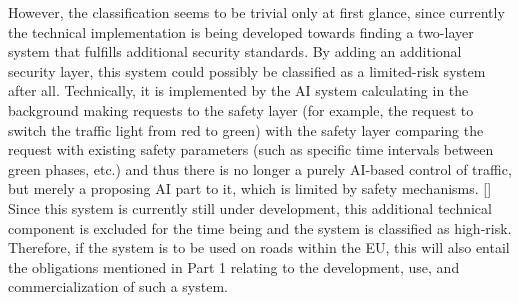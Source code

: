 However, the classification seems to be trivial only at first glance, since currently the technical implementation is being developed towards finding a two-layer system that fulfills additional security standards. By adding an additional security layer, this system could possibly be classified as a limited-risk system after all. Technically, it is implemented by the AI system calculating in the background making requests to the safety layer (for example, the request to switch the traffic light from red to green) with the safety layer comparing the request with existing safety parameters (such as specific time intervals between green phases, etc.) and thus there is no longer a purely AI-based control of traffic, but merely a proposing  AI part to it, which is limited by safety mechanisms. [\citet{seick}] Since this system is currently still under development, this additional technical component is excluded for the time being and the system is classified as high-risk.\newline
Therefore, if the system is to be used on roads within the EU, this will also entail the obligations mentioned in Part 1 relating to the development, use, and commercialization of such a system.
